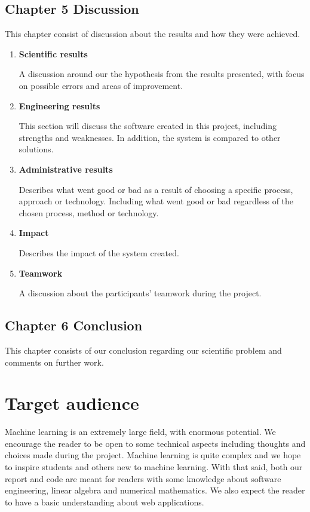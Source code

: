 \subsection{Chapter 5 Discussion}
This chapter consist of discussion about the results and how they were achieved.
\begin{enumerate}
    \item \textbf{Scientific results}
    
    A discussion around our the hypothesis from the results presented, with focus on possible errors and areas of improvement.
    
    \item \textbf{Engineering results}
    
    This section will discuss the software created in this project, including strengths and weaknesses. In addition, the system is compared to other solutions.
    
    \item \textbf{Administrative results}
    
    Describes what went good or bad as a result of choosing a specific process, approach or technology. Including what went good or bad regardless of the chosen process, method or technology.
    
    \item \textbf{Impact}
    
    Describes the impact of the system created.
    
    \item \textbf{Teamwork}
    
    A discussion about the participants' teamwork during the project.
    
\end{enumerate}
\subsection{Chapter 6 Conclusion}
This chapter consists of our conclusion regarding our scientific problem and comments on further work.

\section{Target audience}
Machine learning is an extremely large field, with enormous potential. We encourage the reader to be open to some technical aspects including thoughts and choices made during the project. Machine learning is quite complex and we hope to inspire students and others new to machine learning. With that said, both our report and code are meant for readers with some knowledge about software engineering, linear algebra and numerical mathematics. We also expect the reader to have a basic understanding about web applications.

